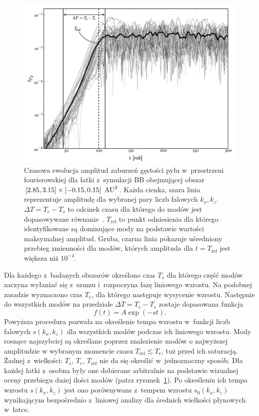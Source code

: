 \begin{figure}
  \includegraphics[width=0.98\linewidth]{figures/fig7}

  \caption[Ewolucja amplitud zaburzeń gęstości w symulacji BB.]
    {Czasowa ewolucja amplitud zaburzeń gęstości pyłu w~przestrzeni
     fourierowskiej dla łatki z~symulacji BB obejmującej obszar 
     $[2.85,3.15]\times[-0.15,0.15]~\hbox{$\thinspace\textrm{AU}$}^2$. Każda cienka, szara linia
     reprezentuje amplitudę dla wybranej pary liczb falowych $k_x, k_z$.
     $\Delta T = T_e - T_s$ to odcinek czasu dla którego do modów jest
     dopasowywane równanie~. $T_{\textrm{ref}}$ to punkt
     odniesienia dla którego identyfikowane są dominujące mody na podstawie
     wartości maksymalnej amplitud. Gruba, czarna linia pokazuje uśredniony
     przebieg zmienności dla modów, których amplituda dla $t = T_{\textrm{ref}}$
     jest większa niż $10^{-4}$.} 
   \label{fig7} 
\end{figure}

Dla każdego z~badanych obszarów określono czas $T_s$ dla którego część modów
zaczyna wyłaniać się z~szumu i~rozpoczyna fazę liniowego wzrostu. Na
podobnej zasadzie wyznaczono czas $T_e$, dla którego następuje wysycenie
wzrostu. Następnie do wszystkich modów na przedziale $\Delta T = T_e - T_s$
zostaje dopasowana funkcja
%
\begin{equation}
   f(t) = A\exp\left(-s t\right).
   \label{eq:fit}
\end{equation}
%
Powyższa procedura pozwala na określenie tempa wzrostu w~funkcji liczb falowych
$s(k_x, k_z)$ dla wszystkich modów podczas ich liniowego wzrostu. Mody rosnące
najszybciej są określane poprzez znalezienie modów o najwyższej amplitudzie w
wybranym momencie czasu $T_{\textrm{ref}} \lesssim T_e$, tuż przed ich
saturacją. Żadnej z~wielkości: $T_s$, $T_e$, $T_{\textrm{ref}}$ nie da się
określić w~jednoznaczny sposób. Dla każdej łatki z~osobna były one dobierane
arbitralnie na podstawie wizualnej oceny przebiegu dużej ilości modów (patrz
rysunek~\ref{fig7}).  Po określeniu ich tempa wzrostu $s(k_x, k_z)$ jest ono
porównywane z~tempem wzrostu $s_0(k_x, k_z)$ wynikającym bezpośrednio z~liniowej
analizy dla średnich wielkości płynowych w~łatce.

